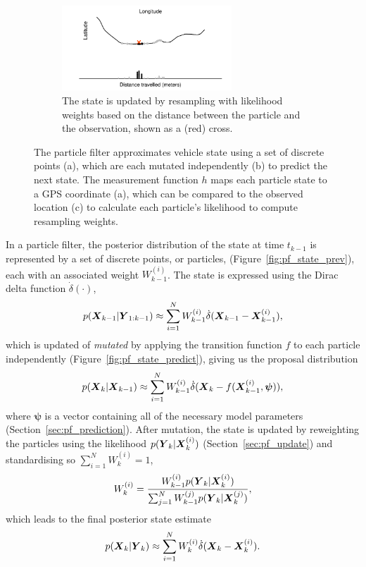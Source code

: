 \begin{figure}[p]
    \begin{subfigure}[t]{0.9\textwidth}
        \centering
        \includegraphics[width=0.7\textwidth]{figures/03_particle_filter_4.pdf}
        \caption{
            The state is updated by resampling with likelihood weights based on the distance
            between the particle and the observation, shown as a (red) cross.
        }
        \label{fig:pf_state_predict2}
    \end{subfigure}
    \caption{
        The particle filter approximates vehicle state using a set of
        discrete points (a), which are each mutated independently (b)
        to predict the next state.
        The measurement function $h$ maps each particle state
        to a GPS coordinate (a),
        which can be compared to the observed location (c)
        to calculate each particle's likelihood to compute resampling weights.
    }
    \label{fig:pf_state}
\end{figure}

\afterpage{\clearpage}

In a particle filter, the posterior distribution of the state at time $t_{k-1}$
is represented by a set of discrete points, or particles, (Figure~\ref{fig:pf_state_prev}),
each with an associated weight $W_{k-1}^{(i)}$.
The state is expressed using the Dirac delta function $\dot\delta(\cdot)$,
\begin{equation*}
p(\mbox{$\boldsymbol{X}$}_{k-1} | \mbox{$\boldsymbol{Y}$}_{1:k-1}) \approx
    \sum_{i=1}^N W_{k-1}^{(i)} \dot\delta(\mbox{$\boldsymbol{X}$}_{k-1} - \mbox{$\boldsymbol{X}$}_{k-1}^{(i)}),
\end{equation*}
which is updated of \emph{mutated} by applying the transition function $f$
to each particle independently (Figure~\ref{fig:pf_state_predict}),
giving us the proposal distribution
\begin{equation*}
p(\mbox{$\boldsymbol{X}$}_k | \mbox{$\boldsymbol{X}$}_{k-1}) \approx
    \sum_{i=1}^N W_{k-1}^{(i)} \dot\delta(\mbox{$\boldsymbol{X}$}_{k} - f(\mbox{$\boldsymbol{X}$}_{k-1}^{(i)}, \boldsymbol{\psi})),
\end{equation*}
where $\boldsymbol{\psi}$ is a vector containing all of the necessary model parameters
(Section~\ref{sec:pf_prediction}).
After mutation,
the state is updated by reweighting the particles using the likelihood $p(\mbox{$\boldsymbol{Y}$}_k | \mbox{$\boldsymbol{X}$}_k^{(i)})$
(Section~\ref{sec:pf_update}) and standardising so $\sum_{i=1}^N W_k^{(i)} = 1$,
\begin{equation*}
W_k^{(i)} = \frac{W_{k-1}^{(i)} p(\mbox{$\boldsymbol{Y}$}_k | \mbox{$\boldsymbol{X}$}_k^{(i)})}{
    \sum_{j=1}^N W_{k-1}^{(j)} p(\mbox{$\boldsymbol{Y}$}_k | \mbox{$\boldsymbol{X}$}_k^{(j)})
},
\end{equation*}
which leads to the final posterior state estimate
\begin{equation*}
p(\mbox{$\boldsymbol{X}$}_k | \mbox{$\boldsymbol{Y}$}_k) \approx
    \sum_{i=1}^N W_{k}^{(i)} \dot\delta(\mbox{$\boldsymbol{X}$}_{k} - \mbox{$\boldsymbol{X}$}_{k}^{(i)}).
\end{equation*}

